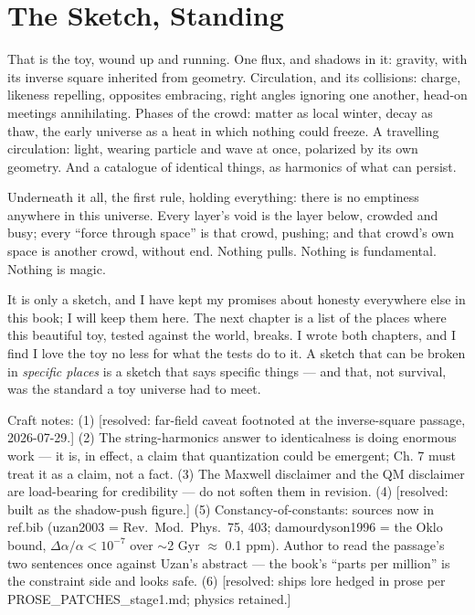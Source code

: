 \documentclass[fontsize=11pt,paper=a4,pagesize=auto,parskip=half-]{scrbook}
\newcommand\En{\centerline{\textemdash \qquad \ding{166} \qquad \textemdash}}
\newif\ifdraftnotes
\newenvironment{draftnote}{%
  \ifdraftnotes\par\small\itshape\color{black!60}\noindent[Craft notes: \ignorespaces
  \else\setbox0\vbox\bgroup\fi}{%
  \ifdraftnotes]\par\normalcolor\normalsize
  \else\egroup\fi}
\begin{document}
\section{The Sketch, Standing}

That is the toy, wound up and running. One flux, and shadows in it: gravity, with its inverse square inherited from geometry. Circulation, and its collisions: charge, likeness repelling, opposites embracing, right angles ignoring one another, head-on meetings annihilating. Phases of the crowd: matter as local winter, decay as thaw, the early universe as a heat in which nothing could freeze. A travelling circulation: light, wearing particle and wave at once, polarized by its own geometry. And a catalogue of identical things, as harmonics of what can persist.

Underneath it all, the first rule, holding everything: there is no emptiness anywhere in this universe. Every layer's void is the layer below, crowded and busy; every ``force through space'' is that crowd, pushing; and that crowd's own space is another crowd, without end. Nothing pulls. Nothing is fundamental. Nothing is magic.

It is only a sketch, and I have kept my promises about honesty everywhere else in this book; I will keep them here. The next chapter is a list of the places where this beautiful toy, tested against the world, breaks. I wrote both chapters, and I find I love the toy no less for what the tests do to it. A sketch that can be broken in \emph{specific places} is a sketch that says specific things --- and that, not survival, was the standard a toy universe had to meet.

\En

\begin{draftnote}
Craft notes: (1) [resolved: far-field caveat footnoted at the inverse-square passage, 2026-07-29.] (2) The string-harmonics answer to identicalness is doing enormous work --- it is, in effect, a claim that quantization could be emergent; Ch. 7 must treat it as a claim, not a fact. (3) The Maxwell disclaimer and the QM disclaimer are load-bearing for credibility --- do not soften them in revision. (4) [resolved: built as the shadow-push figure.] (5) Constancy-of-constants: sources now in ref.bib (uzan2003 = Rev.~Mod.~Phys.~75, 403; damourdyson1996 = the Oklo bound, $\Delta\alpha/\alpha < 10^{-7}$ over $\sim$2 Gyr $\approx$ 0.1 ppm). Author to read the passage's two sentences once against Uzan's abstract --- the book's ``parts per million'' is the constraint side and looks safe. (6) [resolved: ships lore hedged in prose per PROSE\_PATCHES\_stage1.md; physics retained.]
\end{draftnote}
\end{document}
